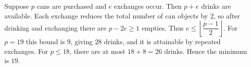Suppose $p$ cans are purchased and $e$ exchanges occur. Then $p+e$ drinks are available. Each exchange reduces the total number of can objects by $2$, so after drinking and exchanging there are $p-2e\ge1$ empties. Thus $e\le\left\lfloor\dfrac{p-1}{2}\right\rfloor$. For $p=19$ this bound is $9$, giving $28$ drinks, and it is attainable by repeated exchanges. For $p\le18$, there are at most $18+8=26$ drinks. Hence the minimum is $\boxed{19}$.
